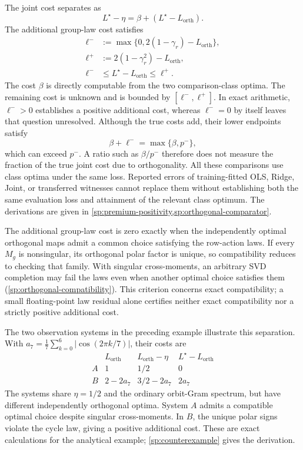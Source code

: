 The joint cost separates as
\[
 L^\star-\eta
 =
 \beta+(L^\star-L_{\mathrm{orth}}).
\]
The additional group-law cost satisfies
\[
 \begin{aligned}
 \ell^-
 &:=
 \max\{0,2(1-\gamma_r)-L_{\mathrm{orth}}\},\\
 \ell^+
 &:=
 2(1-\gamma_r^2)-L_{\mathrm{orth}},\\
 \ell^-
 &\le L^\star-L_{\mathrm{orth}}\le\ell^+.
 \end{aligned}
\]
The cost $\beta$ is directly computable from the two
comparison-class optima.
The remaining cost is unknown and is bounded by
$[\ell^-,\ell^+]$.
In exact arithmetic, $\ell^->0$ establishes a positive
additional cost, whereas $\ell^-=0$ by itself leaves that question
unresolved.
Although the true costs add, their lower endpoints satisfy
\[
 \beta+\ell^-=\max\{\beta,p^-\},
\]
which can exceed $p^-$.
A ratio such as $\beta/p^-$ therefore does not measure
the fraction of the true joint cost due to orthogonality.
All these comparisons use class optima under the same loss.
Reported errors of training-fitted OLS, Ridge, Joint, or
transferred witnesses cannot replace them without establishing
both the same evaluation loss and attainment of the relevant
class optimum.
The derivations are given in
\cref{sp:premium-positivity,sp:orthogonal-comparator}.

The additional group-law cost is zero exactly when the
independently optimal orthogonal maps admit a common
choice satisfying the row-action laws.
If every $M_g$ is nonsingular, its orthogonal polar factor
is unique, so compatibility reduces to checking that family.
With singular cross-moments, an arbitrary SVD completion
may fail the laws even when another optimal choice satisfies
them (\cref{sp:orthogonal-compatibility}).
This criterion concerns exact compatibility; a small
floating-point law residual alone certifies neither exact
compatibility nor a strictly positive additional cost.

The two observation systems in the preceding example
illustrate this separation.
With
$a_7=\frac17\sum_{k=0}^{6}|\cos(2\pi k/7)|$, their costs are
\[
 \begin{array}{c|ccc}
  & L_{\mathrm{orth}}
  & L_{\mathrm{orth}}-\eta
  & L^\star-L_{\mathrm{orth}}\\
  \hline
  A & 1 & 1/2 & 0\\
  B & 2-2a_7 & 3/2-2a_7 & 2a_7
 \end{array}
\]
The systems share $\eta=1/2$ and the ordinary orbit-Gram
spectrum, but have different independently orthogonal optima.
System $A$ admits a compatible optimal choice despite
singular cross-moments.
In $B$, the unique polar signs violate the cycle law,
giving a positive additional cost.
These are exact calculations for the analytical example;
\cref{sp:counterexample} gives the derivation.

